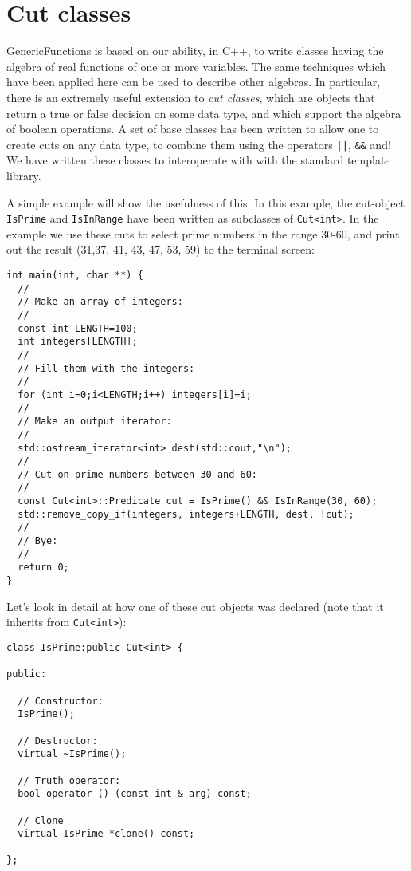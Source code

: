 \documentclass{report}
\begin{document}
\section {Cut classes}

GenericFunctions is based on our ability, in C++, to write classes
having the algebra of real functions of one or more variables.  The
same techniques which have been applied here can be used to describe
other algebras.  In particular, there is an extremely useful extension
to {\it cut classes}, which are objects that return a true or false
decision on some data type, and which support the algebra of boolean
operations.  A set of base classes has been written to allow one to
create cuts on any data type, to combine them using the operators
\verb+||+, \verb+&&+ and!  We have written these classes to
interoperate with with the standard template library.

A simple example will show the usefulness of this.  In this example, the cut-object
\verb+IsPrime+ and \verb+IsInRange+ have been written as subclasses of \verb+Cut<int>+.  In 
the example we use these cuts to select prime numbers in the range 30-60, and print
out the result (31,37, 41, 43, 47, 53, 59) to the terminal screen:
\begin{verbatim}
int main(int, char **) {
  //
  // Make an array of integers:
  //
  const int LENGTH=100;
  int integers[LENGTH];
  //
  // Fill them with the integers:
  //
  for (int i=0;i<LENGTH;i++) integers[i]=i;
  //
  // Make an output iterator:
  //
  std::ostream_iterator<int> dest(std::cout,"\n");
  //
  // Cut on prime numbers between 30 and 60:
  //
  const Cut<int>::Predicate cut = IsPrime() && IsInRange(30, 60);
  std::remove_copy_if(integers, integers+LENGTH, dest, !cut);
  //
  // Bye:
  //
  return 0;
}
\end{verbatim}

Let's look in detail at how one of these cut objects was declared 
(note that it inherits from \verb+Cut<int>+):
\begin{verbatim}
class IsPrime:public Cut<int> {

public:

  // Constructor:
  IsPrime();

  // Destructor:
  virtual ~IsPrime();

  // Truth operator:
  bool operator () (const int & arg) const;

  // Clone
  virtual IsPrime *clone() const;

};

\end{verbatim}
\end{document}
